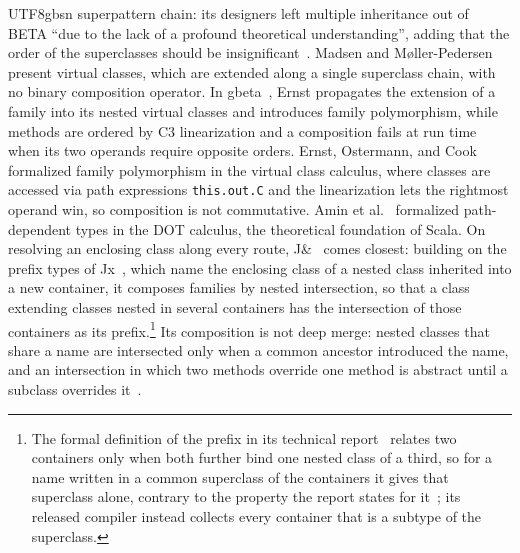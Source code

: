 \begin{CJK*}{UTF8}{gbsn}
superpattern chain: its designers left multiple inheritance out of
BETA ``due to the lack of a profound theoretical understanding'',
adding that the order of the superclasses should be
insignificant~\cite[p.~103]{madsen1993-beta-programming-language}.
Madsen and M{\o}ller-Pedersen~\cite{madsen1989-virtual-classes}
present virtual classes, which are extended along a single superclass
chain, with no binary composition operator.
In gbeta~\cite{ernst1999-gbeta, ernst2001-family-polymorphism}, Ernst
propagates the extension of a family into its nested virtual classes
and introduces family polymorphism, while methods are ordered by C3
linearization and a composition fails at run time when its two
operands require opposite orders.
Ernst, Ostermann, and Cook~\cite{ernst2006-virtual-class-calculus}
formalized family polymorphism in the virtual class calculus, where
classes are accessed via path expressions \texttt{this.out.C} and the
linearization lets the rightmost operand win, so composition is not
commutative.
Amin et al.~\cite{amin2016-dependent-object-types} formalized path-dependent types
in the DOT calculus, the theoretical foundation of Scala.
On resolving an enclosing class along every route, J\&~\cite{nystrom2006-nested-intersection} comes
closest: building on the prefix types of Jx~\cite{nystrom2004-nested-inheritance}, which name the
enclosing class of a nested class inherited into a new container, it composes families by nested
intersection, so that a class extending classes nested in several containers has the intersection of
those containers as its prefix.\footnote{The formal definition of the prefix in its technical
  report~\cite[Figure~12]{nystrom2006-nested-intersection-report} relates two containers only when both
  further bind one nested class of a third, so for a name written in a common superclass of the
  containers it gives that superclass alone, contrary to the property the report states for
  it~\cite[Appendix~A.3]{nystrom2006-nested-intersection-report}; its released compiler instead
  collects every container that is a subtype of the superclass.}
Its composition is not deep merge: nested classes that share a name are intersected only when a common
ancestor introduced the name, and an intersection in which two methods override one method is abstract
until a subclass overrides it~\cite[\S~3.3]{nystrom2006-nested-intersection}.

\end{CJK*}
